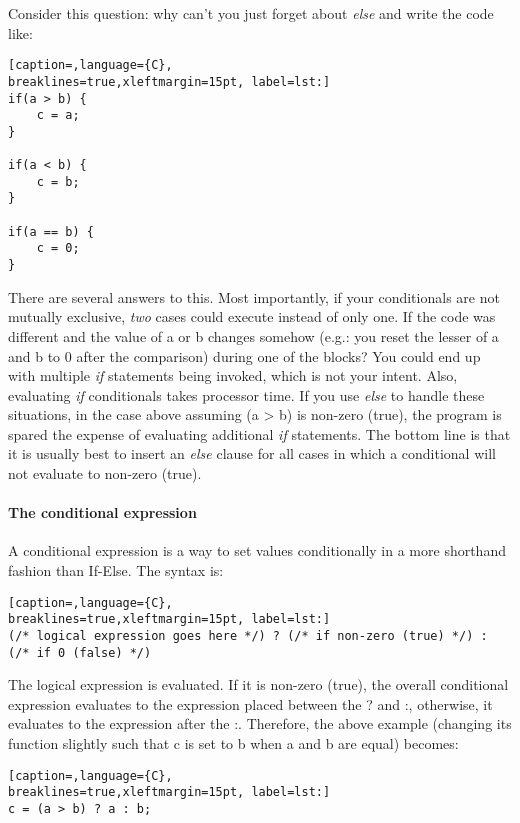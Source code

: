 Consider this question: why can't you just forget about \emph{else} and write
the code like:

\lstset{basicstyle=\scriptsize, numbers=left, captionpos=b, tabsize=4}
\begin{lstlisting}[caption=,language={C},
breaklines=true,xleftmargin=15pt, label=lst:]
if(a > b) {
	c = a;
}

if(a < b) {
	c = b;
}

if(a == b) {
	c = 0;
}
\end{lstlisting}

There are several answers to this. Most importantly, if your conditionals are
not mutually exclusive, \emph{two} cases could execute instead of only one. If
the code was different and the value of a or b changes somehow (e.g.: you reset
the lesser of a and b to 0 after the comparison) during one of the blocks? You
could end up with multiple \emph{if} statements being invoked, which is not
your intent. Also, evaluating \emph{if} conditionals takes processor time. If
you use \emph{else} to handle these situations, in the case above assuming (a
\textgreater{} b) is non-zero (true), the program is spared the expense of
evaluating additional \emph{if} statements. The bottom line is that it is
usually best to insert an \emph{else} clause for all cases in which a
conditional will not evaluate to non-zero (true).

\paragraph{The conditional expression}
A conditional expression is a way to set values conditionally in a more
shorthand fashion than If-Else. The syntax is:
\lstset{basicstyle=\scriptsize, numbers=left, captionpos=b, tabsize=4}
\begin{lstlisting}[caption=,language={C},
breaklines=true,xleftmargin=15pt, label=lst:]
(/* logical expression goes here */) ? (/* if non-zero (true) */) : (/* if 0 (false) */)
\end{lstlisting}

The logical expression is evaluated. If it is non-zero (true), the overall
conditional expression evaluates to the expression placed between the ? and :,
otherwise, it evaluates to the expression after the :. Therefore, the above
example (changing its function slightly such that c is set to b when a and b
are equal) becomes:

\lstset{basicstyle=\scriptsize, numbers=left, captionpos=b, tabsize=4}
\begin{lstlisting}[caption=,language={C},
breaklines=true,xleftmargin=15pt, label=lst:]
c = (a > b) ? a : b;
\end{lstlisting}

